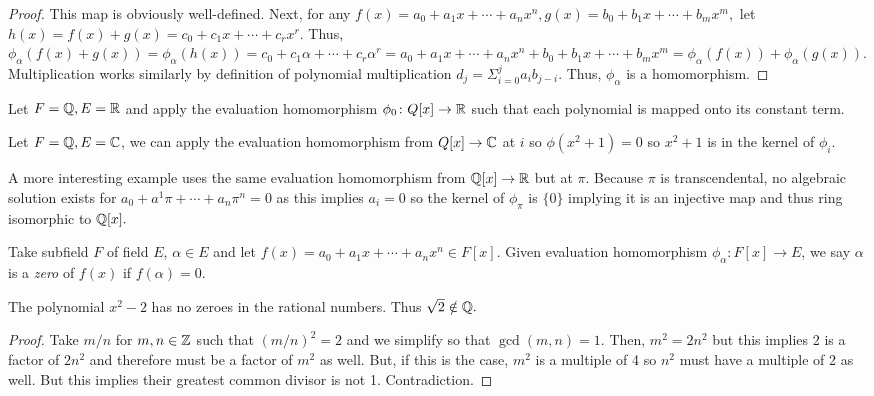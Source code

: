 \begin{proof}
    This map is obviously well-defined. Next, for any $f(x) = a_0 + a_1x + \cdots + a_nx^n, g(x) = b_0 + b_1x + \cdots + b_mx^m,$ let $h(x) = f(x) + g(x) = c_0 + c_1x + \cdots + c_rx^r.$ Thus, $\phi_\alpha(f(x) + g(x)) = \phi_\alpha(h(x)) = c_0 + c_1\alpha + \cdots + c_r\alpha^r = a_0 + a_1x + \cdots + a_nx^n + b_0 + b_1x + \cdots + b_mx^m = \phi_\alpha(f(x)) + \phi_\alpha(g(x)).$ Multiplication works similarly by definition of polynomial multiplication $d_j = \Sigma_{i = 0}^j a_ib_{j-i}.$ Thus, $\phi_\alpha$ is a homomorphism.
\end{proof}
\begin{example}
    Let $F = \mathbb{Q}, E = \mathbb{R}$ and apply the evaluation homomorphism $\phi_0\colon Q[x] \to \mathbb{R}$ such that each polynomial is mapped onto its constant term.
\end{example}
\begin{example}
    Let $F = \mathbb{Q}, E = \mathbb{C}$, we can apply the evaluation homomorphism from $Q[x] \to \mathbb{C}$ at $i$ so $\phi(x^2 + 1) = 0$ so $x^2+1$ is in the kernel of $\phi_i.$
\end{example}
\begin{remark}
    A more interesting example uses the same evaluation homomorphism from $\mathbb{Q}[x] \to \mathbb{R}$ but at $\pi$. Because $\pi$ is transcendental, no algebraic solution exists for $a_0 + a^1\pi + \cdots + a_n\pi^n = 0$ as this implies $a_i = 0$ so the kernel of $\phi_\pi$ is $\{0\}$ implying it is an injective map and thus ring isomorphic to $\mathbb{Q}[x].$
\end{remark}
\begin{definition}[Zero of $f(x)$]
    Take subfield $F$ of field $E$, $\alpha \in E$ and let $f(x) = a_0 + a_1x + \cdots + a_nx^n \in F[x]$. Given evaluation homomorphism $\phi_\alpha\colon F[x] \to E$, we say $\alpha$ is a \emph{zero} of $f(x)$ if $f(\alpha) = 0.$
\end{definition}
\begin{theorem}
    The polynomial $x^2 - 2$ has no zeroes in the rational numbers. Thus $\sqrt{2} \notin \mathbb{Q}.$
\end{theorem}
\begin{proof}
    Take $m/n$ for $m, n \in \mathbb{Z}$ such that $(m/n)^2 = 2$ and we simplify so that $\gcd(m,n) = 1.$ Then, $m^2 = 2n^2$ but this implies 2 is a factor of $2n^2$ and therefore must be a factor of $m^2$ as well. But, if this is the case, $m^2$ is a multiple of 4 so $n^2$ must have a multiple of 2 as well. But this implies their greatest common divisor is not 1. Contradiction.
\end{proof}


